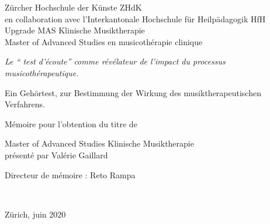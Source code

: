 
\begin{titlepage}
 \begin{center}
    \Large
     Zürcher Hochschule der Künste ZHdK\\
 	en collaboration avec l'Interkantonale Hochschule für
        Heilpädagogik HfH \\
	 Upgrade MAS Klinische Musiktherapie \\ Master of Advanced Studies en musicothérapie clinique\\
  \vfill
  { \LARGE
\emph{Le `` test d'écoute'' comme  révélateur de l'impact
  du processus musicothérapeutique.}\\ \bigskip


Ein Gehörtest, zur Bestimmung der Wirkung des musiktherapeutischen Verfahrens.} 
 \vfill
 
Mémoire pour l'obtention du titre de

Master of Advanced Studies Klinische Musiktherapie \\ présenté par Valérie Gaillard

{\large Directeur de mémoire : Reto Rampa}


 
	 \hfill \\
	 \rule{0mm}{1pt} \hfill 
{\large Zürich, juin 2020}
 \end{center}
\end{titlepage}
